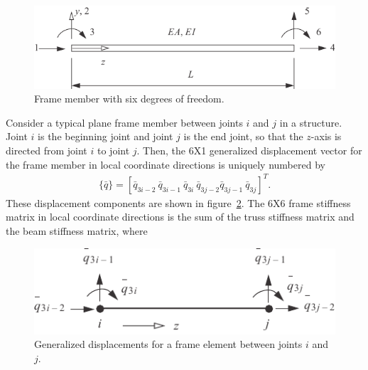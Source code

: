 \documentclass{AeroStructure-ERJohnson}
\begin{document}
\begin{figure}[!h]
\centerline{\includegraphics{Figure_16-20.pdf}}
\caption{Frame member with six degrees of freedom.}\label{fig16.20}
\end{figure}

Consider a typical plane frame member between joints $i$ and $j$ in a structure. Joint $i$ is the beginning joint and joint $j$ is the end joint, so that the $z$-axis is directed from joint $i$ to joint $j$. Then, the 6X1 generalized displacement vector for the frame member in local coordinate directions is uniquely numbered by
\begin{align}\label{eq16.62}
\{\bar{q}\}=\left[\bar{q}_{3 i-2}\ \bar{q}_{3 i-1}\ \bar{q}_{3 i}\ \bar{q}_{3 j-2}\right.\left.\bar{q}_{3 j-1}\ \bar{q}_{3 j}\right]^{T}.
\end{align}
\noindent These displacement components are shown in figure~\ref{fig16.21}. The 6X6 frame stiffness matrix in local coordinate directions is the sum of the truss stiffness matrix and the beam stiffness matrix, where

\begin{figure}[!h]
\centerline{\includegraphics{Figure_16-21.pdf}}
\caption{Generalized displacements for a frame element between joints $i$ and $j$.}\label{fig16.21}
\end{figure}

\vspace*{-1.25pc}
\end{document}
